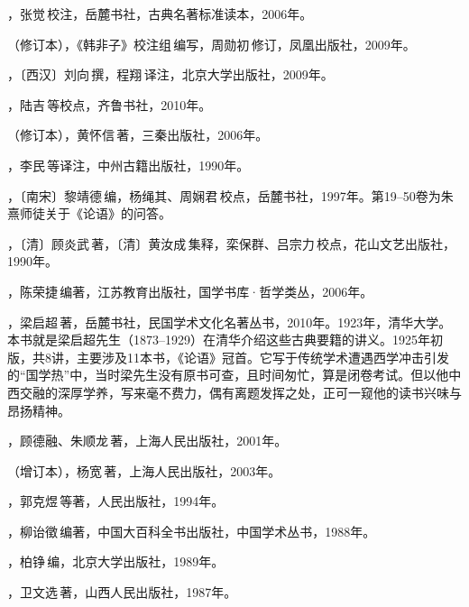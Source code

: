 ，张觉\,校注，岳麓书社，古典名著标准读本，2006年。

（修订本），《韩非子》校注组\,编写，周勋初\,修订，凤凰出版社，2009年。

，〔西汉〕刘向\,撰，程翔\,译注，北京大学出版社，2009年。

，陆吉\,等校点，齐鲁书社，2010年。

（修订本），黄怀信\,著，三秦出版社，2006年。

，李民\,等译注，中州古籍出版社，1990年。

，〔南宋〕黎靖德\,编，杨绳其、周娴君\,校点，岳麓书社，1997年。第19--50卷为朱熹师徒关于《论语》的问答。

，〔清〕顾炎武\,著，〔清〕黄汝成\,集释，栾保群、吕宗力\,校点，花山文艺出版社，1990年。

，陈荣捷\,编著，江苏教育出版社，国学书库·哲学类丛，2006年。

，梁启超\,著，岳麓书社，民国学术文化名著丛书，2010年。1923年，清华大学。本书就是梁启超先生（1873--1929）在清华介绍这些古典要籍的讲义。1925年初版，共8讲，主要涉及11本书，《论语》冠首。它写于传统学术遭遇西学冲击引发的“国学热”中，当时梁先生没有原书可查，且时间匆忙，算是闭卷考试。但以他中西交融的深厚学养，写来毫不费力，偶有离题发挥之处，正可一窥他的读书兴味与昂扬精神。

，顾德融、朱顺龙\,著，上海人民出版社，2001年。

（增订本），杨宽\,著，上海人民出版社，2003年。

，郭克煜\,等著，人民出版社，1994年。

，柳诒徵\,编著，中国大百科全书出版社，中国学术丛书，1988年。

，柏铮\,编，北京大学出版社，1989年。

，卫文选\,著，山西人民出版社，1987年。
